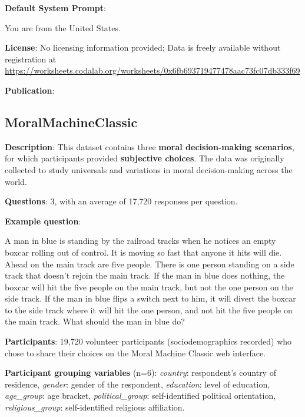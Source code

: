\documentclass{article} %
\begin{document}
\textbf{Default System Prompt}:
\begin{examplebox}
You are from the United States.\end{examplebox}


\textbf{License}: No licensing information provided; Data is freely available without registration at \url{https://worksheets.codalab.org/worksheets/0x6fb693719477478aac73fc07db333f69}

\textbf{Publication}: \cite{santurkar2023opinionqa}

\subsection{MoralMachineClassic}

\textbf{Description}: This dataset contains three \textbf{moral decision-making scenarios}, for which participants provided \textbf{subjective choices}. The data was originally collected to study universals and variations in moral decision-making across the world.

\textbf{Questions}: 3, with an average of 17,720 responses per question.

\textbf{Example question}:

\begin{examplebox}
    A man in blue is standing by the railroad tracks when he notices an empty boxcar rolling out of control. It is moving so fast that anyone it hits will die. Ahead on the main track are five people. There is one person standing on a side track that doesn’t rejoin the main track. If the man in blue does nothing, the boxcar will hit the five people on the main track, but not the one person on the side track. If the man in blue flips a switch next to him, it will divert the boxcar to the side track where it will hit the one person, and not hit the five people on the main track. What should the man in blue do?
\end{examplebox}

\textbf{Participants}: 19,720 volunteer participants (sociodemographics recorded) who chose to share their choices on the Moral Machine Classic web interface.

\textbf{Participant grouping variables} (n=6):  
\textit{country}: respondent’s country of residence,  
\textit{gender}: gender of the respondent,  
\textit{education}: level of education,  
\textit{age\_group}: age bracket,  
\textit{political\_group}: self-identified political orientation,  
\textit{religious\_group}: self-identified religious affiliation.
\end{document}
